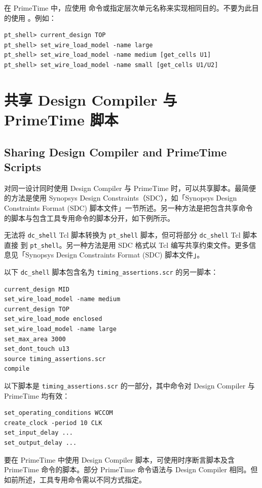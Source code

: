 在 PrimeTime 中，应使用  命令或指定层次单元名称来实现相同目的。不要为此目的使用 。例如：
\begin{lstlisting}
pt_shell> current_design TOP
pt_shell> set_wire_load_model -name large
pt_shell> set_wire_load_model -name medium [get_cells U1]
pt_shell> set_wire_load_model -name small [get_cells U1/U2]
\end{lstlisting}

\section{共享 Design Compiler 与 PrimeTime 脚本}
\subsection*{Sharing Design Compiler and PrimeTime Scripts}

对同一设计同时使用 Design Compiler 与 PrimeTime 时，可以共享脚本。最简便的方法是使用 Synopsys Design Constraints（SDC），如「Synopsys Design Constraints Format (SDC) 脚本文件」一节所述。另一种方法是把包含共享命令的脚本与包含工具专用命令的脚本分开，如下例所示。

\begin{noteBox}
无法将 \texttt{dc\_shell} Tcl 脚本转换为 \texttt{pt\_shell} 脚本，但可将部分 \texttt{dc\_shell} Tcl 脚本直接  到 \texttt{pt\_shell}。另一种方法是用 SDC 格式以 Tcl 编写共享约束文件。更多信息见「Synopsys Design Constraints Format (SDC) 脚本文件」。
\end{noteBox}

以下 \texttt{dc\_shell} 脚本包含名为 \texttt{timing\_assertions.scr} 的另一脚本：
\begin{lstlisting}
current_design MID
set_wire_load_model -name medium
current_design TOP
set_wire_load_mode enclosed
set_wire_load_model -name large
set_max_area 3000
set_dont_touch u13
source timing_assertions.scr
compile
\end{lstlisting}

以下脚本是 \texttt{timing\_assertions.scr} 的一部分，其中命令对 Design Compiler 与 PrimeTime 均有效：
\begin{lstlisting}
set_operating_conditions WCCOM
create_clock -period 10 CLK
set_input_delay ...
set_output_delay ...
\end{lstlisting}

要在 PrimeTime 中使用 Design Compiler 脚本，可使用时序断言脚本及含 PrimeTime 命令的脚本。部分 PrimeTime 命令语法与 Design Compiler 相同。但如前所述，工具专用命令需以不同方式指定。


